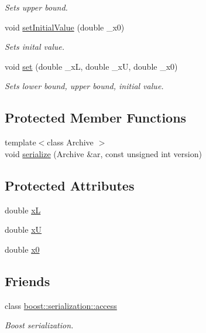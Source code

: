 \begin{DoxyCompactItemize}
\begin{DoxyCompactList}\small\item\em Sets upper bound. \end{DoxyCompactList}\item 
void \hyperlink{class_c_optimization_variable_a9b63133ea00f6aeed300c5ffd8ddabc8}{set\-Initial\-Value} (double \-\_\-x0)
\begin{DoxyCompactList}\small\item\em Sets inital value. \end{DoxyCompactList}\item 
void \hyperlink{class_c_optimization_variable_aaa2c98237b7a25ec3e111485fc631309}{set} (double \-\_\-x\-L, double \-\_\-x\-U, double \-\_\-x0)
\begin{DoxyCompactList}\small\item\em Sets lower bound, upper bound, initial value. \end{DoxyCompactList}\end{DoxyCompactItemize}
\subsection*{Protected Member Functions}
\begin{DoxyCompactItemize}
\item 
{\footnotesize template$<$class Archive $>$ }\\void \hyperlink{class_c_optimization_variable_ac7773d84cb5dcaf32b7f130fe60cbb8a}{serialize} (Archive \&ar, const unsigned int version)
\end{DoxyCompactItemize}
\subsection*{Protected Attributes}
\begin{DoxyCompactItemize}
\item 
double \hyperlink{class_c_optimization_variable_a64d40e05e5a9832e0e2aaebdbd105365}{x\-L}
\item 
double \hyperlink{class_c_optimization_variable_a549a16352636f3ec68729d197823716d}{x\-U}
\item 
double \hyperlink{class_c_optimization_variable_af67ef7c2faf37cb193309c7a540aee31}{x0}
\end{DoxyCompactItemize}
\subsection*{Friends}
\begin{DoxyCompactItemize}
\item 
class \hyperlink{class_c_optimization_variable_ac98d07dd8f7b70e16ccb9a01abf56b9c}{boost\-::serialization\-::access}
\begin{DoxyCompactList}\small\item\em Boost serialization. \end{DoxyCompactList}\end{DoxyCompactItemize}


